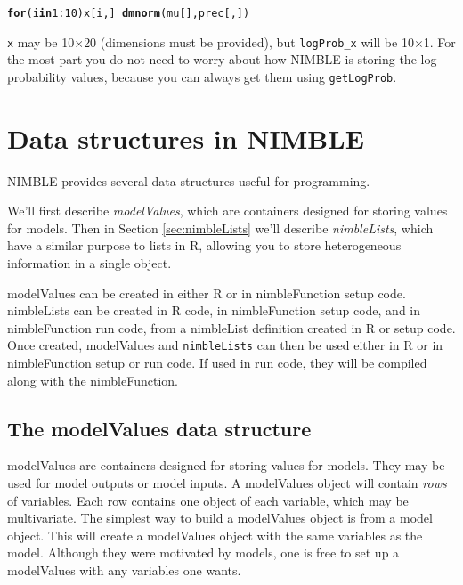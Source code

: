 \documentclass[12pt,oneside]{book}\usepackage[]{graphicx}\usepackage[]{color}
\makeatletter
\newcommand{\hlnum}[1]{\textcolor[rgb]{0.686,0.059,0.569}{#1}}%
\newcommand{\hlopt}[1]{\textcolor[rgb]{0,0,0}{#1}}%
\newcommand{\hlstd}[1]{\textcolor[rgb]{0.345,0.345,0.345}{#1}}%
\newcommand{\hlkwa}[1]{\textcolor[rgb]{0.161,0.373,0.58}{\textbf{#1}}}%
\newcommand{\hlkwd}[1]{\textcolor[rgb]{0.737,0.353,0.396}{\textbf{#1}}}%
\newenvironment{kframe}{%
 \def\at@end@of@kframe{}%
 \ifinner\ifhmode%
  \def\at@end@of@kframe{\end{minipage}}%
  \begin{minipage}{\columnwidth}%
 \fi\fi%
 \def\FrameCommand##1{\hskip\@totalleftmargin \hskip-\fboxsep
 \colorbox{shadecolor}{##1}\hskip-\fboxsep
     \hskip-\linewidth \hskip-\@totalleftmargin \hskip\columnwidth}%
 \MakeFramed {\advance\hsize-\width
   \@totalleftmargin\z@ \linewidth\hsize
   \@setminipage}}%
 {\par\unskip\endMakeFramed%
 \at@end@of@kframe}
\newenvironment{knitrout}{}{} %
\def\cd#1{\texttt{#1}}
\def\nm#1{\textit{#1}}
\makeatother
\begin{document}
\begin{knitrout}
\color{fgcolor}\begin{kframe}
\begin{alltt}
\hlkwa{for}\hlstd{(i} \hlkwa{in} \hlnum{1}\hlopt{:}\hlnum{10}\hlstd{) x[i,]} \hlopt{~} \hlkwd{dmnorm}\hlstd{(mu[], prec[,])}
\end{alltt}
\end{kframe}
\end{knitrout}

\cd{x} may be 10$\times$20 (dimensions must be provided), but \cd{logProb\_x}
will be 10$\times$1.  For the most part you do not need to worry about
how NIMBLE is storing the log probability values, because you can
always get them using \cd{getLogProb}.  








\chapter{Data structures in NIMBLE}
\label{cha:data-structures}

NIMBLE provides several data structures useful for programming.

We'll first describe \nm{modelValues}, which are containers designed for
storing values for models. Then in Section \ref{sec:nimbleLists} we'll describe \nm{nimbleLists}, which have a similar purpose to lists in R, allowing you to store heterogeneous information in a single object. 

modelValues can be created in either R or in nimbleFunction setup code.  nimbleLists can be created in R code, in nimbleFunction setup code, and in nimbleFunction run code, from a nimbleList definition created in R or setup code. Once created, modelValues and \cd{nimbleLists} can then be used either in R or in nimbleFunction setup or run code.  If used in run code, they will be compiled along with the nimbleFunction.

\section{The modelValues data structure}
\label{sec:modelValues-struct}

modelValues are containers designed for
storing values for models.  They may be used for model outputs or
model inputs. A modelValues object will contain \emph{rows} of
variables. Each row  contains one object of each variable, which may
be multivariate. The simplest way to build a
modelValues object is from a model object. This will create a
modelValues object with the same variables as the model.  Although
they were motivated by models, one is free to set up a
modelValues with any variables one wants.
\end{document}
